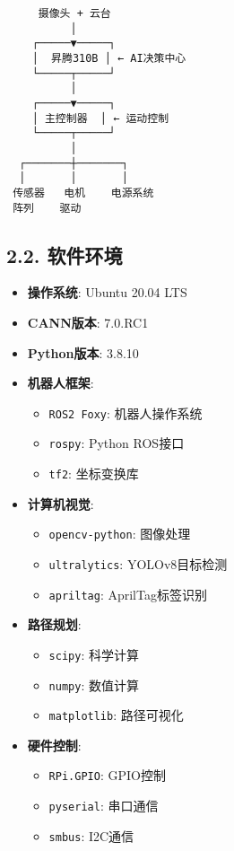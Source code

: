 \begin{lstlisting}
     摄像头 + 云台
          │
    ┌─────▼─────┐
    │  昇腾310B │ ← AI决策中心
    └─────┬─────┘
          │
    ┌─────▼─────┐
    │ 主控制器  │ ← 运动控制
    └─────┬─────┘
          │
  ┌───────┼───────┐
  │       │       │
 传感器   电机    电源系统
 阵列    驱动
\end{lstlisting}

\subsection{2.2. 软件环境}\label{ux8f6fux4ef6ux73afux5883}

\begin{itemize}
\tightlist
\item
  \textbf{操作系统}: Ubuntu 20.04 LTS
\item
  \textbf{CANN版本}: 7.0.RC1
\item
  \textbf{Python版本}: 3.8.10
\item
  \textbf{机器人框架}:

  \begin{itemize}
  \tightlist
  \item
    \passthrough{\lstinline!ROS2 Foxy!}: 机器人操作系统
  \item
    \passthrough{\lstinline!rospy!}: Python ROS接口
  \item
    \passthrough{\lstinline!tf2!}: 坐标变换库
  \end{itemize}
\item
  \textbf{计算机视觉}:

  \begin{itemize}
  \tightlist
  \item
    \passthrough{\lstinline!opencv-python!}: 图像处理
  \item
    \passthrough{\lstinline!ultralytics!}: YOLOv8目标检测
  \item
    \passthrough{\lstinline!apriltag!}: AprilTag标签识别
  \end{itemize}
\item
  \textbf{路径规划}:

  \begin{itemize}
  \tightlist
  \item
    \passthrough{\lstinline!scipy!}: 科学计算
  \item
    \passthrough{\lstinline!numpy!}: 数值计算
  \item
    \passthrough{\lstinline!matplotlib!}: 路径可视化
  \end{itemize}
\item
  \textbf{硬件控制}:

  \begin{itemize}
  \tightlist
  \item
    \passthrough{\lstinline!RPi.GPIO!}: GPIO控制
  \item
    \passthrough{\lstinline!pyserial!}: 串口通信
  \item
    \passthrough{\lstinline!smbus!}: I2C通信
  \end{itemize}
\end{itemize}

